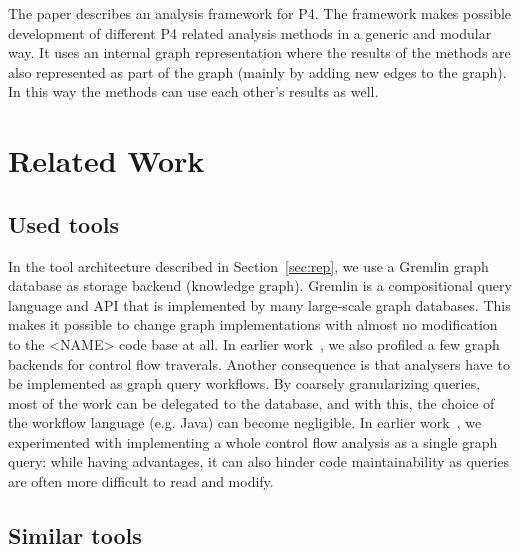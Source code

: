 \documentclass[sigconf]{acmart}
\begin{document}
	The paper describes an analysis framework for P4. The framework makes possible development of different P4 related analysis methods in a generic and modular way. It uses an internal graph representation where the results of the methods are also represented as part of the graph (mainly by adding new edges to the graph). In this way the methods can use each other's results as well.  
	
	
	\section{Related Work}
	
	\subsection{Used tools}

  In the tool architecture described in Section~\ref{sec:rep}, we use a Gremlin graph database as storage backend (knowledge graph). Gremlin is a compositional query language and API that is implemented by many large-scale graph databases. This makes it possible to change graph implementations with almost no modification to the <NAME> code base at all. In earlier work~\cite{icai20}, we also profiled a few graph backends for control flow traverals. 
  Another consequence is that analysers have to be implemented as graph query workflows. By coarsely granularizing queries, most of the work can be delegated to the database, and with this, the choice of the workflow language (e.g. Java) can become negligible. In earlier work~\cite{macs20}, we experimented with implementing a whole control flow analysis as a single graph query: while having advantages, it can also hinder code maintainability as queries are often more difficult to read and modify. 


	\subsection{Similar tools}	
	
	
\end{document}
